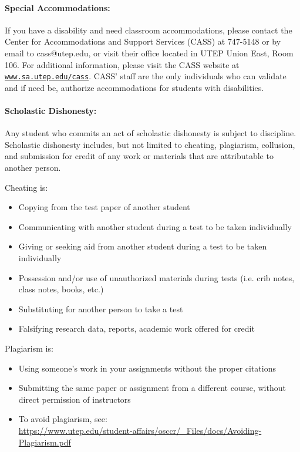 \documentclass[12pt]{scrartcl}
\begin{document}
\paragraph{Special Accommodations: }
If you have a disability and need classroom accommodations, please contact the Center for Accommodations and Support Services (CASS) at 747-5148 or by email to cass@utep.edu, or visit their office located in UTEP Union East, Room 106. For additional information, please visit the CASS website at \href{http://www.sa.utep.edu/cass}{\texttt{www.sa.utep.edu/cass}}. CASS’ staff are the only individuals who can validate and if need be, authorize accommodations for students with disabilities.


\paragraph{Scholastic Dishonesty: }
Any student who commits an act of scholastic dishonesty is subject to discipline. Scholastic dishonesty includes, but not limited to cheating, plagiarism, collusion, and submission for credit of any work or materials that are attributable to another person.

Cheating is:
\begin{itemize}
\item Copying from the test paper of another student
\item Communicating with another student during a test to be taken individually
\item Giving or seeking aid from another student during a test to be taken individually
\item Possession and/or use of unauthorized materials during tests (i.e. crib notes, class notes, books, etc.)
\item Substituting for another person to take a test
\item Falsifying research data, reports, academic work offered for credit
\end{itemize}

Plagiarism is:
\begin{itemize}
\item Using someone’s work in your assignments without the proper citations
\item Submitting the same paper or assignment from a different course, without direct permission of instructors
\item[]\vspace{1em} To avoid plagiarism, see: \\{\footnotesize\url{https://www.utep.edu/student-affairs/osccr/_Files/docs/Avoiding-Plagiarism.pdf}}
\end{itemize}
                               
\end{document}
